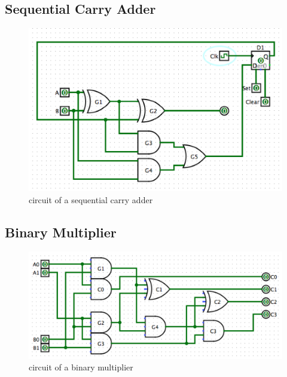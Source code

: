 \documentclass[12pt]{article}
\begin{document}
\subsection{Sequential Carry Adder}
\begin{figure}[h]
    \centering
    \includegraphics{sequential_carry_adder.png}
    \caption{circuit of a sequential carry adder}
\end{figure}



\subsection{Binary Multiplier}
\begin{figure}[h]
    \centering
    \includegraphics{bin_multiplier.png}
    \caption{circuit of a binary multiplier}
\end{figure}

\end{document}
